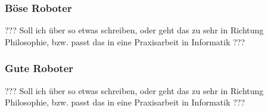 \subsubsection{Böse Roboter}

??? Soll ich über so etwas schreiben, oder geht das zu sehr in Richtung
Philosophie, bzw. passt das in eine Praxisarbeit in Informatik ???

\subsubsection{Gute Roboter}

??? Soll ich über so etwas schreiben, oder geht das zu sehr in Richtung
Philosophie, bzw. passt das in eine Praxisarbeit in Informatik ???
